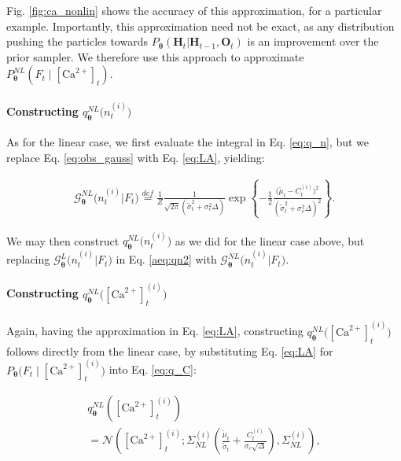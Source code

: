 \documentclass[10pt]{article}
\providecommand{\ve}[1]{\boldsymbol{#1}}
\providecommand{\ve}[1]{\boldsymbol{#1}}
\newcommand{\thetn}{\ve{\theta}}
\newcommand{\p}{P_{\thetn}}
\newcommand{\Ca}{[\text{Ca}^{2+}]}
\begin{document}
Fig. \ref{fig:ca_nonlin} shows the accuracy of this approximation, for a particular example.  Importantly, this approximation need not be exact, as any distribution pushing the particles towards $\p(\ve{H}_t | \ve{H}_{t-1}, \ve{O}_t)$ is an improvement over the prior sampler. %
We therefore use this approach to approximate \mbox{$\p^{NL}(F_t \mid \Ca_t)$}.%

\paragraph{Constructing $q_{\thetn}^{NL}\big(n_t^{(i)}\big)$}

As for the linear case, we first evaluate the integral in Eq. \ref{eq:q_n}, but we replace Eq. \ref{eq:obs_gauss} with Eq. \ref{eq:LA}, yielding:

\begin{align}
\mathcal{G}_{\thetn}^{NL}\big(n_t^{(i)} | F_t\big) \stackrel{def}{=}\frac{1}{Z} \frac{1}{\sqrt{2 \pi} (\widetilde{\sigma}_t^2 + \sigma_c^2 \Delta)} \exp \left\{-\frac{1}{2}\frac{\big(\widetilde{\mu}_t - C_t^{(i)} \big)^2}{(\widetilde{\sigma}_t^2 + \sigma_c^2 \Delta)^2}\right\}. 
\end{align}

\noindent We may then construct $q_{\thetn}^{NL}\big(n_t^{(i)}\big)$ as we did for the linear case above, but replacing $\mathcal{G}_{\thetn}^L\big(n_t^{(i)} | F_t\big)$ in Eq. \ref{aeq:qn2} with $\mathcal{G}_{\thetn}^{NL}\big(n_t^{(i)} | F_t \big)$.

\paragraph{Constructing $q_{\thetn}^{NL}\big(\Ca_t^{(i)}\big)$}

Again, having the approximation in Eq. \ref{eq:LA}, constructing $q_{\thetn}^{NL}\big(\Ca_t^{(i)}\big)$ follows directly from the linear case, by substituting Eq. \ref{eq:LA} for $\p\big(F_t \mid \Ca_t^{(i)}\big)$ into Eq. \ref{eq:q_C}:

\begin{multline}
q_{\thetn}^{NL}(\Ca_t^{(i)}) \\= \mathcal{N}\left(\Ca_t^{(i)}; \Sigma_{NL}^{(i)} \left(\frac{\widetilde{\mu}_t}{\widetilde{\sigma}_t} + \frac{C_t^{(i)}}{\sigma_c \sqrt{\Delta}}\right),\Sigma_{NL}^{(i)} \right),
\end{multline}
\end{document}
